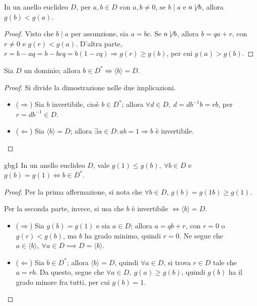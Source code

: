 \documentclass[11pt, a4paper]{scrartcl}
\theoremstyle{definition}
\numberwithin{esempio}{section}
\theoremstyle{definition}
\numberwithin{obs}{section}
\numberwithin{nota}{section}
\numberwithin{equation}{subsection}
\begin{document}
\begin{lemma}
	{}{}
	In un anello euclideo $D$, per $a,b \in D$ con $a,b \neq 0$, se $b  \mid a$ e $a \not  \mid b$, allora $g(b) < g(a)$.
	\begin{proof}
		Visto che $b  \mid a$ per assunzione, sia $a = bc$.
		Se $a \not  \mid b$, allora $b = qa + r$, con $r\neq 0$ e $g(r) < g(a)$.
		D'altra parte, $r = b - aq = b - bcq = b(1-cq)\Rightarrow g(r) \ge g(b)$, per cui $g(a) > g(b)$.
	\end{proof}
\end{lemma}
\begin{prop}
	{}{}
Sia $D$ un dominio; allora $b \in D^* \iff \langle b \rangle= D$.
\begin{proof}
	Si divide la dimostrazione nelle due implicazioni.
	\begin{itemize}
		\item ($\Rightarrow $) Sia $b$ invertibile, cio\`e $b \in D^*$; allora $\forall d \in D, \ d = d b^{-1} b = r b$, per $r = db^{-1} \in D$.
		\item ($\Leftarrow$) Sia $\langle b \rangle= D$; allora $\exists a \in D : a b = 1 \Rightarrow b$ \`e invertibile.
	\end{itemize}
\end{proof}
\end{prop}
\begin{lemma}
	{}{gbg1}
	In un anello euclideo $D$, vale $g(1) \le g(b), \ \forall b \in D$ e $g(b) = g(1) \iff b \in D^*$.
	\begin{proof}
		Per la prima affermazione, si nota che $\forall b \in D$, $g(b)=g(1b) \ge g(1)$.

		Per la seconda parte, invece, si usa che $b$ \`e invertibile $\iff \langle b \rangle=D$.
		\begin{itemize}
			\item ($\Rightarrow $) Sia $g(b) = g(1)$ e sia $a \in D$; allora $a = qb +r$, con $r = 0$ o $g(r) < g(b)$, ma $b$ ha grado minimo, quindi $r =0 $. 
				Ne segue che $a \in \langle b \rangle, \ \forall a \in D\implies D = \langle b \rangle$.
			\item ($\Leftarrow$) Sia $b \in D^*$; allora $\langle b \rangle= D$, quindi $\forall  a \in D$, si trova $r \in D$ tale che $a = rb$.
				Da questo, segue che $\forall a \in D, \ g(a) \ge g(b)$, quindi $g(b)$ ha il grado minore fra tutti, per cui $g(b) = 1$.
		\end{itemize}
	\end{proof}
\end{lemma}
\end{document}
